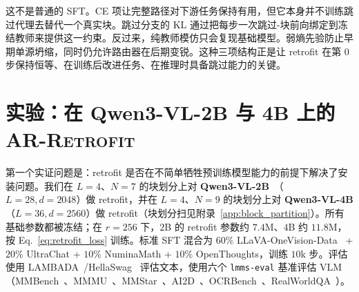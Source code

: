 \documentclass{article}
\newcommand{\retrofit}{\textsc{AR-Retrofit}}
\begin{document}
这不是普通的 SFT。CE 项让完整路径对下游任务保持有用，但它本身并不训练跳过代理去替代一个真实块。跳过分支的 KL 通过把每步一次跳过-块前向绑定到冻结教师来提供这一约束。反过来，纯教师模仿只会复现基础模型。弱熵先验防止早期单源坍缩，同时仍允许路由器在后期变锐。这种三项结构正是让 retrofit 在第 $0$ 步保持恒等、在训练后改进任务、在推理时具备跳过能力的关键。

\section{实验：在 Qwen3-VL-2B 与 4B 上的 \retrofit{}}
\label{sec:experiments}
\label{sec:exp_retrofit}

第一个实证问题是：retrofit 是否在不简单牺牲预训练模型能力的前提下解决了安装问题。我们在 $L{=}4$、$N{=}7$ 的块划分上对 \textbf{Qwen3-VL-2B}~\citep{bai2025qwen3vl}（$L{=}28, d{=}2048$）做 retrofit，并在 $L{=}4$、$N{=}9$ 的块划分上对 \textbf{Qwen3-VL-4B}（$L{=}36, d{=}2560$）做 retrofit（块划分扫见附录~\ref{app:block_partition}）。所有基础参数都被冻结；在 $r{=}256$ 下，$2$B 的 retrofit 参数约 $7.4$M、$4$B 约 $11.8$M，按 Eq.~\ref{eq:retrofit_loss} 训练。标准 SFT 混合为 $60\%$ LLaVA-OneVision-Data~\citep{li2024llavaonevision} + $20\%$ UltraChat + $10\%$ NuminaMath + $10\%$ OpenThoughts，训练 $10$k 步。评估使用 LAMBADA~\citep{paperno2016lambada}/HellaSwag~\citep{zellers2019hellaswag} 评估文本，使用六个 \texttt{lmms-eval} 基准评估 VLM（MMBench~\citep{liu2023mmbench}、MMMU~\citep{yue2024mmmu}、MMStar~\citep{chen2024mmstar}、AI2D~\citep{kembhavi2016ai2d}、OCRBench~\citep{liu2024ocrbench}、RealWorldQA~\citep{grok2024realworldqa}）。
\end{document}
